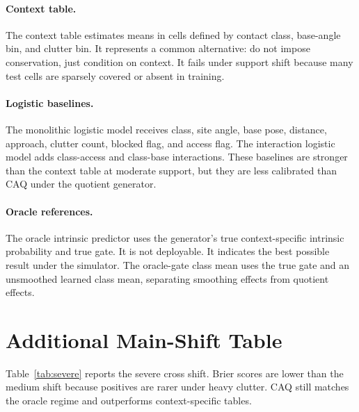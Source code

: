 \documentclass{article}
\begin{document}
\paragraph{Context table.}
The context table estimates means in cells defined by contact class, base-angle bin, and clutter bin. It represents a common alternative: do not impose conservation, just condition on context. It fails under support shift because many test cells are sparsely covered or absent in training.

\paragraph{Logistic baselines.}
The monolithic logistic model receives class, site angle, base pose, distance, approach, clutter count, blocked flag, and access flag. The interaction logistic model adds class-access and class-base interactions. These baselines are stronger than the context table at moderate support, but they are less calibrated than CAQ under the quotient generator.

\paragraph{Oracle references.}
The oracle intrinsic predictor uses the generator's true context-specific intrinsic probability and true gate. It is not deployable. It indicates the best possible result under the simulator. The oracle-gate class mean uses the true gate and an unsmoothed learned class mean, separating smoothing effects from quotient effects.

\section{Additional Main-Shift Table}

Table~\ref{tab:severe} reports the severe cross shift. Brier scores are lower than the medium shift because positives are rarer under heavy clutter. CAQ still matches the oracle regime and outperforms context-specific tables.
\end{document}
